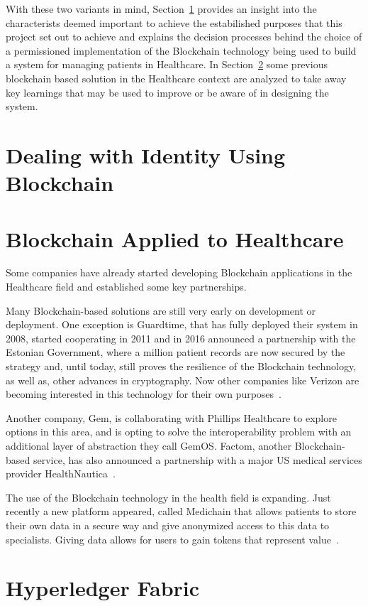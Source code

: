 With these two variants in mind, Section~\ref{choosingHyperledger} provides an insight into the characterists deemed important to achieve the estabilished purposes that this project set out to achieve and explains the decision processes behind the choice of a permissioned implementation of the Blockchain technology being used to build a system for managing patients in Healthcare. In Section~\ref{blockchainHealthcare} some previous blockchain based solution in the Healthcare context are analyzed to take away key learnings that may be used to improve or be aware of in designing the system.


\section{Dealing with Identity Using Blockchain}\label{choosingHyperledger}

\section{Blockchain Applied to Healthcare}\label{blockchainHealthcare}

Some companies have already started developing Blockchain applications in the
Healthcare field and established some key partnerships.

Many Blockchain-based solutions are still very early on development or
deployment.  One exception is Guardtime, that has fully deployed their system
in 2008, started cooperating in 2011 and in 2016 announced a partnership with
the Estonian Government, where a million patient records are now secured by the
strategy and, until today, still proves the resilience of the Blockchain
technology, as well as, other advances in cryptography.  Now other companies
like Verizon are becoming interested in this technology for their own
purposes~\cite{GuardTime2018,EstonianGovernmentGuardTime2016}.

Another company, Gem, is collaborating with Phillips Healthcare to explore
options in this area, and is opting to solve the interoperability problem with
an additional layer of abstraction they call GemOS.  Factom, another
Blockchain-based service, has also announced a partnership with a major US
medical services provider
HealthNautica~\cite{BlockchainCompHealth2017,FactomPartnership2017}.

The use of the Blockchain technology in the health field is expanding. Just
recently a new platform appeared, called Medichain that allows patients to
store their own data in a secure way and give anonymized access to this data to
specialists. Giving data allows for users to gain tokens that represent
value~\cite{MediChain2018}.

\section{Hyperledger Fabric}
